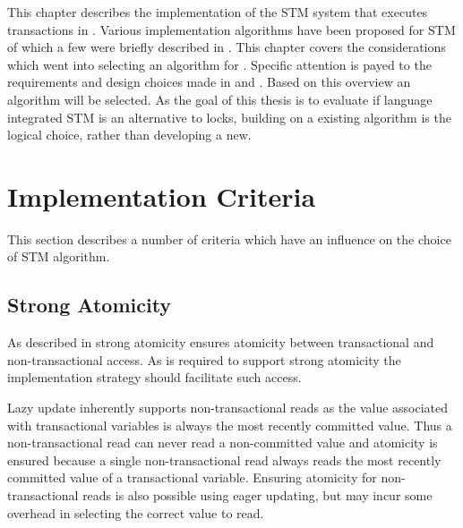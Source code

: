 \makeatletter {}\makeatother
{}
This chapter describes the implementation of the \ac{STM} system that executes transactions in \stmname. Various implementation algorithms have been proposed for \ac{STM} of which a few were briefly described in . This chapter covers the considerations which went into selecting an algorithm for \stmname. Specific attention is payed to the requirements and design choices made in  and . Based on this overview an algorithm will be selected. As the goal of this thesis is to evaluate if language integrated \ac{STM} is an alternative to locks, building on a existing algorithm is the logical choice, rather than developing a new.
\label{chap:implementation}
\section{Implementation Criteria}
\label{sec:stm_impl_criteria}
This section describes a number of criteria which have an influence on the choice of \ac{STM} algorithm.

\subsection{Strong Atomicity}
As described in  strong atomicity ensures atomicity between transactional and non-transactional access. As \stmnamesp is required to support strong atomicity the implementation strategy should facilitate such access.

Lazy update inherently supports non-transactional reads as the value associated with transactional variables is always the most recently committed value\cite[p. 2084]{herlihy2011tm}\cite[p. 21]{harris2010transactional}. Thus a non-transactional read can never read a non-committed value and atomicity is ensured because a single non-transactional read always reads the most recently committed value of a transactional variable. Ensuring atomicity for non-transactional reads is also possible using eager updating, but may incur some overhead in selecting the correct value to read. 

